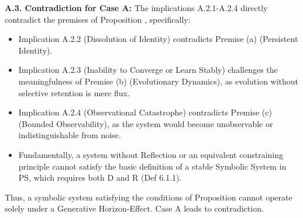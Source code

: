 \textbf{A.3. Contradiction for Case A:} The implications A.2.1-A.2.4 directly contradict the premises of Proposition , specifically:
\begin{itemize}
    \item Implication A.2.2 (Dissolution of Identity) contradicts Premise (a) (Persistent Identity).
    \item Implication A.2.3 (Inability to Converge or Learn Stably) challenges the meaningfulness of Premise (b) (Evolutionary Dynamics), as evolution without selective retention is mere flux.
    \item Implication A.2.4 (Observational Catastrophe) contradicts Premise (c) (Bounded Observability), as the system would become unobservable or indistinguishable from noise.
    \item Fundamentally, a system without Reflection or an equivalent constraining principle cannot satisfy the basic definition of a stable Symbolic System in PS, which requires both D and R (Def 6.1.1).
\end{itemize}
Thus, a symbolic system satisfying the conditions of Proposition  cannot operate solely under a Generative Horizon-Effect. Case A leads to contradiction.
